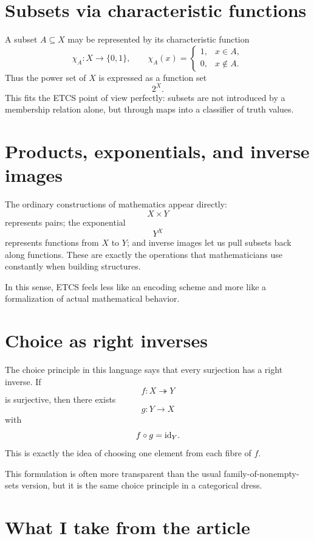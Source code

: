 \section{Subsets via characteristic functions}

A subset \(A\subseteq X\) may be represented by its characteristic function
\[
  \chi_A:X\to\{0,1\},\qquad
  \chi_A(x)=
  \begin{cases}
    1,&x\in A,\\
    0,&x\notin A.
  \end{cases}
\]
Thus the power set of \(X\) is expressed as a function set
\[
  2^X.
\]
This fits the ETCS point of view perfectly: subsets are not introduced by a membership relation alone, but through maps into a classifier of truth values.

\section{Products, exponentials, and inverse images}

The ordinary constructions of mathematics appear directly:
\[
  X\times Y
\]
represents pairs; the exponential
\[
  Y^X
\]
represents functions from \(X\) to \(Y\); and inverse images let us pull subsets back along functions.  These are exactly the operations that mathematicians use constantly when building structures.

\begin{remark}
In this sense, ETCS feels less like an encoding scheme and more like a formalization of actual mathematical behavior.
\end{remark}

\section{Choice as right inverses}

The choice principle in this language says that every surjection has a right inverse.  If
\[
  f:X\twoheadrightarrow Y
\]
is surjective, then there exists
\[
  g:Y\to X
\]
with
\[
  f\circ g=\mathrm{id}_Y.
\]
This is exactly the idea of choosing one element from each fibre of \(f\).

\begin{caution}
This formulation is often more transparent than the usual family-of-nonempty-sets version, but it is the same choice principle in a categorical dress.
\end{caution}

\section{What I take from the article}

